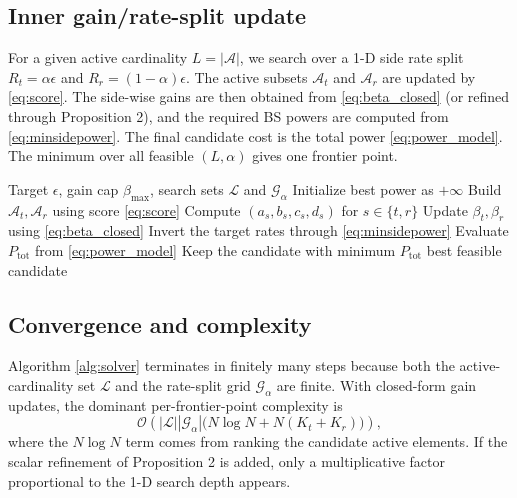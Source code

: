\documentclass[journal]{IEEEtran}
\begin{document}
\subsection{Inner gain/rate-split update}
For a given active cardinality $L=|\mathcal{A}|$, we search over a 1-D side rate split $R_t=\alpha\epsilon$ and $R_r=(1-\alpha)\epsilon$. The active subsets $\mathcal{A}_t$ and $\mathcal{A}_r$ are updated by \eqref{eq:score}. The side-wise gains are then obtained from \eqref{eq:beta_closed} (or refined through Proposition 2), and the required BS powers are computed from \eqref{eq:minsidepower}. The final candidate cost is the total power \eqref{eq:power_model}. The minimum over all feasible $(L,\alpha)$ gives one frontier point.

\begin{algorithm}[t]
\caption{Sparse-Activation $\epsilon$-Constraint Solver}
\label{alg:solver}
\begin{algorithmic}[1]
\Require Target $\epsilon$, gain cap $\beta_{\max}$, search sets $\mathcal{L}$ and $\mathcal{G}_\alpha$
\State Initialize best power as $+\infty$
        \State Build $\mathcal{A}_t,\mathcal{A}_r$ using score \eqref{eq:score}
        \State Compute $(a_s,b_s,c_s,d_s)$ for $s\in\{t,r\}$
        \State Update $\beta_t,\beta_r$ using \eqref{eq:beta_closed}
        \State Invert the target rates through \eqref{eq:minsidepower}
            \State Evaluate $P_{\mathrm{tot}}$ from \eqref{eq:power_model}
            \State Keep the candidate with minimum $P_{\mathrm{tot}}$
        \EndIf
    \EndFor
\EndFor
\State \Return best feasible candidate
\end{algorithmic}
\end{algorithm}

\subsection{Convergence and complexity}
Algorithm \ref{alg:solver} terminates in finitely many steps because both the active-cardinality set $\mathcal{L}$ and the rate-split grid $\mathcal{G}_\alpha$ are finite. With closed-form gain updates, the dominant per-frontier-point complexity is
\[
\mathcal{O}\!\left(|\mathcal{L}||\mathcal{G}_\alpha|
\big(N\log N + N(K_t+K_r)\big)\right),
\]
where the $N\log N$ term comes from ranking the candidate active elements. If the scalar refinement of Proposition 2 is added, only a multiplicative factor proportional to the 1-D search depth appears.
\end{document}
